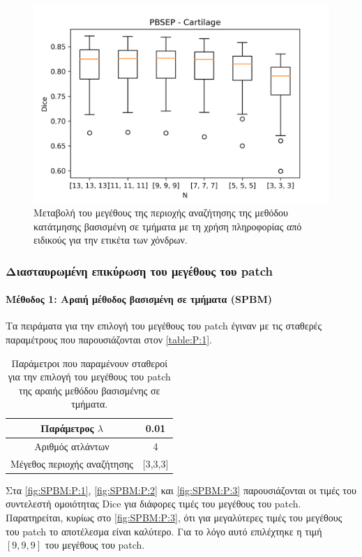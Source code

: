 \documentclass[a4paper,12pt]{article}
\newcommand{\paragraphLine}[1]{\paragraph{#1}\mbox{}}
\begin{document}
\begin{figure}[H]
    \centering
    \includegraphics[width=0.85\linewidth]{PBSEP_N_Cartilage_plot.png}
    \caption{Μεταβολή του μεγέθους της περιοχής αναζήτησης της μεθόδου
             κατάτμησης βασισμένη σε τμήματα με τη χρήση πληροφορίας από
             ειδικούς για την ετικέτα των χόνδρων.}
    \label{fig:PBSEP:N:3}
\end{figure}


\subsubsection{Διασταυρωμένη επικύρωση του μεγέθους του patch}

\paragraphLine{Μέθοδος 1: Αραιή μέθοδος βασισμένη σε τμήματα (SPBM)}

Τα πειράματα για την επιλογή του μεγέθους του patch έγιναν με τις σταθερές
παραμέτρους που παρουσιάζονται στον \autoref{table:P:1}.

\begin{table}[h!]
    \centering
    \begin{tabular}{|c|c|} 
        \hline
        Παράμετρος $\lambda$ & 0.01 \\ 
        \hline
        Αριθμός ατλάντων & 4 \\ 
        \hline
        Μέγεθος περιοχής αναζήτησης & [3,3,3] \\ 
        \hline
    \end{tabular}
    \caption{Παράμετροι που παραμένουν σταθεροί για την επιλογή του μεγέθους
             του patch της αραιής μεθόδου βασισμένης σε τμήματα.}
    \label{table:P:1}
\end{table}

Στα \autoref{fig:SPBM:P:1}, \autoref{fig:SPBM:P:2} και \autoref{fig:SPBM:P:3}
παρουσιάζονται οι τιμές του συντελεστή ομοιότητας Dice για διάφορες τιμές του
μεγέθους του patch. Παρατηρείται, κυρίως στο \autoref{fig:SPBM:P:3}, ότι για
μεγαλύτερες τιμές του μεγέθους του patch το αποτέλεσμα είναι καλύτερο.  Για το
λόγο αυτό επιλέχτηκε η τιμή $[9,9,9]$ του μεγέθους του patch.
\end{document}
